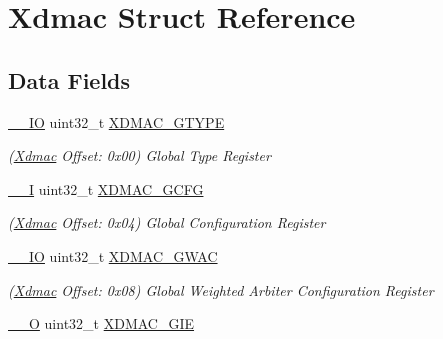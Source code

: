 \hypertarget{structXdmac}{}\section{Xdmac Struct Reference}
\label{structXdmac}
\subsection*{Data Fields}
\begin{DoxyCompactItemize}
\item 
\mbox{\label{structXdmac_a9020084782fdc20ed5f298292d9271a0}} 
\mbox{\hyperlink{core__cm7_8h_aec43007d9998a0a0e01faede4133d6be}{\+\_\+\+\_\+\+IO}} uint32\+\_\+t \mbox{\hyperlink{structXdmac_a9020084782fdc20ed5f298292d9271a0}{X\+D\+M\+A\+C\+\_\+\+G\+T\+Y\+PE}}
\begin{DoxyCompactList}\small\item\em (\mbox{\hyperlink{structXdmac}{Xdmac}} Offset\+: 0x00) Global Type Register \end{DoxyCompactList}\item 
\mbox{\label{structXdmac_af4ed331334658505e35d1d47193c812a}} 
\mbox{\hyperlink{core__cm7_8h_af63697ed9952cc71e1225efe205f6cd3}{\+\_\+\+\_\+I}} uint32\+\_\+t \mbox{\hyperlink{structXdmac_af4ed331334658505e35d1d47193c812a}{X\+D\+M\+A\+C\+\_\+\+G\+C\+FG}}
\begin{DoxyCompactList}\small\item\em (\mbox{\hyperlink{structXdmac}{Xdmac}} Offset\+: 0x04) Global Configuration Register \end{DoxyCompactList}\item 
\mbox{\label{structXdmac_af717798bcfaa615bf7eecc7e94be4981}} 
\mbox{\hyperlink{core__cm7_8h_aec43007d9998a0a0e01faede4133d6be}{\+\_\+\+\_\+\+IO}} uint32\+\_\+t \mbox{\hyperlink{structXdmac_af717798bcfaa615bf7eecc7e94be4981}{X\+D\+M\+A\+C\+\_\+\+G\+W\+AC}}
\begin{DoxyCompactList}\small\item\em (\mbox{\hyperlink{structXdmac}{Xdmac}} Offset\+: 0x08) Global Weighted Arbiter Configuration Register \end{DoxyCompactList}\item 
\mbox{\label{structXdmac_a317e5f246410d323d741d8fa59e46115}} 
\mbox{\hyperlink{core__cm7_8h_a7e25d9380f9ef903923964322e71f2f6}{\+\_\+\+\_\+O}} uint32\+\_\+t \mbox{\hyperlink{structXdmac_a317e5f246410d323d741d8fa59e46115}{X\+D\+M\+A\+C\+\_\+\+G\+IE}}

\end{DoxyCompactItemize}
